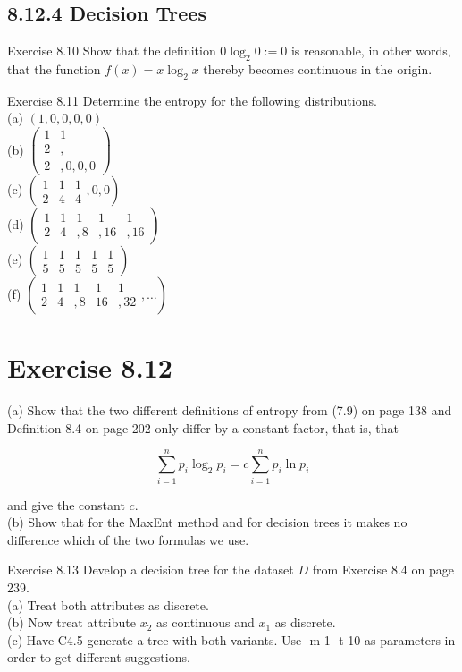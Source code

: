 \documentclass[10pt]{article}
\begin{document}
\subsection*{8.12.4 Decision Trees}
Exercise 8.10 Show that the definition $0 \log _{2} 0:=0$ is reasonable, in other words, that the function $f(x)=x \log _{2} x$ thereby becomes continuous in the origin.

Exercise 8.11 Determine the entropy for the following distributions.\\
(a) $(1,0,0,0,0)$\\
(b) $\left(\begin{array}{ll}1 & 1 \\ 2 & , \\ 2 & , 0,0,0\end{array}\right)$\\
(c) $\left(\begin{array}{ccc}1 & 1 & 1 \\ 2 & 4 & 4\end{array}, 0,0\right)$\\
(d) $\left(\begin{array}{ccccc}1 & 1 & 1 & 1 & 1 \\ 2 & 4 & , 8 & , 16 & , 16\end{array}\right)$\\
(e) $\left(\begin{array}{ccccc}1 & 1 & 1 & 1 & 1 \\ 5 & 5 & 5 & 5 & 5\end{array}\right)$\\
(f) $\left(\begin{array}{ccccc}1 & 1 & 1 & 1 & 1 \\ 2 & 4 & , 8 & 16 & , 32\end{array}, \ldots\right)$

\section*{Exercise 8.12}
(a) Show that the two different definitions of entropy from (7.9) on page 138 and Definition 8.4 on page 202 only differ by a constant factor, that is, that

$$
\sum_{i=1}^{n} p_{i} \log _{2} p_{i}=c \sum_{i=1}^{n} p_{i} \ln p_{i}
$$

and give the constant $c$.\\
(b) Show that for the MaxEnt method and for decision trees it makes no difference which of the two formulas we use.


Exercise 8.13 Develop a decision tree for the dataset $D$ from Exercise 8.4 on page 239.\\
(a) Treat both attributes as discrete.\\
(b) Now treat attribute $x_{2}$ as continuous and $x_{1}$ as discrete.\\
(c) Have C4.5 generate a tree with both variants. Use -m 1 -t 10 as parameters in order to get different suggestions.
\end{document}

